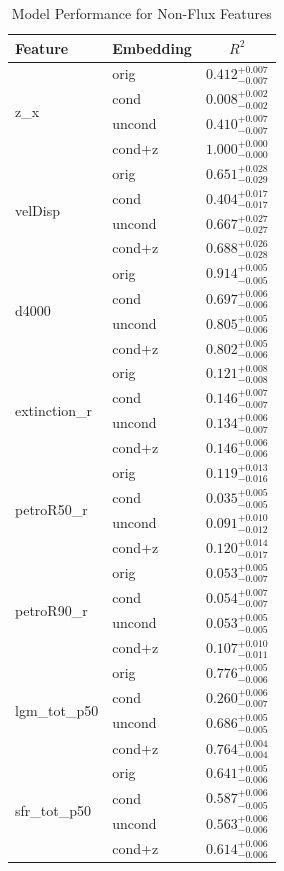 \begin{table}[htbp]
\centering
\caption{Model Performance for Non-Flux Features}
\label{tab:non_flux_results}
\begin{tabular}{llc}
\toprule
\textbf{Feature} & \textbf{Embedding} & \textbf{$R^2$} \\
\midrule
\multirow{4}{*}{z\_x} & orig & $0.412^{+0.007}_{-0.007}$ \\
 & cond & $0.008^{+0.002}_{-0.002}$ \\
 & uncond & $0.410^{+0.007}_{-0.007}$ \\
 & cond+z & $1.000^{+0.000}_{-0.000}$ \\
\midrule
\multirow{4}{*}{velDisp} & orig & $0.651^{+0.028}_{-0.029}$ \\
 & cond & $0.404^{+0.017}_{-0.017}$ \\
 & uncond & $0.667^{+0.027}_{-0.027}$ \\
 & cond+z & $0.688^{+0.026}_{-0.028}$ \\
\midrule
\multirow{4}{*}{d4000} & orig & $0.914^{+0.005}_{-0.005}$ \\
 & cond & $0.697^{+0.006}_{-0.006}$ \\
 & uncond & $0.805^{+0.005}_{-0.006}$ \\
 & cond+z & $0.802^{+0.005}_{-0.006}$ \\
\midrule
\multirow{4}{*}{extinction\_r} & orig & $0.121^{+0.008}_{-0.008}$ \\
 & cond & $0.146^{+0.007}_{-0.007}$ \\
 & uncond & $0.134^{+0.006}_{-0.007}$ \\
 & cond+z & $0.146^{+0.006}_{-0.006}$ \\
\midrule
\multirow{4}{*}{petroR50\_r} & orig & $0.119^{+0.013}_{-0.016}$ \\
 & cond & $0.035^{+0.005}_{-0.005}$ \\
 & uncond & $0.091^{+0.010}_{-0.012}$ \\
 & cond+z & $0.120^{+0.014}_{-0.017}$ \\
\midrule
\multirow{4}{*}{petroR90\_r} & orig & $0.053^{+0.005}_{-0.007}$ \\
 & cond & $0.054^{+0.007}_{-0.007}$ \\
 & uncond & $0.053^{+0.005}_{-0.005}$ \\
 & cond+z & $0.107^{+0.010}_{-0.011}$ \\
\midrule
\multirow{4}{*}{lgm\_tot\_p50} & orig & $0.776^{+0.005}_{-0.006}$ \\
 & cond & $0.260^{+0.006}_{-0.007}$ \\
 & uncond & $0.686^{+0.005}_{-0.005}$ \\
 & cond+z & $0.764^{+0.004}_{-0.004}$ \\
\midrule
\multirow{4}{*}{sfr\_tot\_p50} & orig & $0.641^{+0.005}_{-0.006}$ \\
 & cond & $0.587^{+0.006}_{-0.005}$ \\
 & uncond & $0.563^{+0.006}_{-0.006}$ \\
 & cond+z & $0.614^{+0.006}_{-0.006}$ \\
\bottomrule
\end{tabular}
\end{table}
